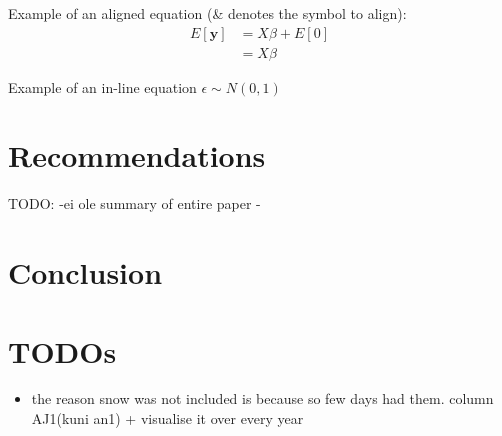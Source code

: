 \documentclass[11pt]{article}
\begin{document}
Example of an aligned equation (\& denotes the symbol to align):
\begin{align*}
    E[\mathbf{y}] &= X\beta + E[0] \\
                  &= X\beta
\end{align*}

Example of an in-line equation $\epsilon \sim N(0, 1)$

\section{Recommendations}
TODO: 
    -ei ole summary of entire paper
    - 


\section{Conclusion}


\section{TODOs}
\begin{itemize} 
    \item the reason snow was not included is because so few days had them. column AJ1(kuni an1) + visualise it over every year
\end{itemize} 


\clearpage

\printbibliography
\end{document}
